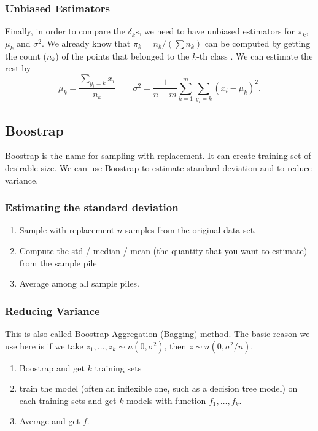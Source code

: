 \documentclass[12pt]{amsart}
\numberwithin{equation}{section}
\theoremstyle{plain}
\theoremstyle{definition}
\begin{document}
\subsubsection{Unbiased Estimators}
Finally, in order to compare the $\delta_k$s, we need to have unbiased estimators for $\pi_k$, $\mu_k$ and $\sigma^2$. We already know that $\pi_k = n_k/(\sum n_k)$ can be computed by getting the count ($n_k$) of the points that belonged to the $k$-th class . We can estimate the rest by 
\begin{equation}\label{GDA_MLE}
\mu_k = \frac{\sum_{y_i = k} x_i}{n_k} \qquad \sigma^2 = \frac{1}{n-m}\sum_{k = 1}^{m}\sum_{y_i = k}(x_i-\mu_k)^2.
\end{equation}


\subsection{Boostrap}

Boostrap is the name for sampling with replacement. It can create training set of desirable size. We can use Boostrap to estimate standard deviation and to reduce variance.

\subsubsection{Estimating the standard deviation}
\begin{enumerate}
\item Sample with replacement $n$ samples from the original data set.
\item Compute the std / median / mean (the quantity that you want to estimate) from the sample pile
\item Average among all sample piles.
\end{enumerate}

\subsubsection{Reducing Variance}
This is also called Boostrap Aggregation (Bagging) method. The basic reason we use here is if we take 
$z_1,\ldots,z_k\sim n(0,\sigma^2)$, then $\bar z \sim n(0,\sigma^2/n)$.
\begin{enumerate}
\item Boostrap and get $k$ training sets
\item train the model (often an inflexible one, such as a decision tree model) on each training sets and get $k$ models with function $f_1,\ldots, f_k$.
\item Average and get $\bar f$.
\end{enumerate}
\end{document}
